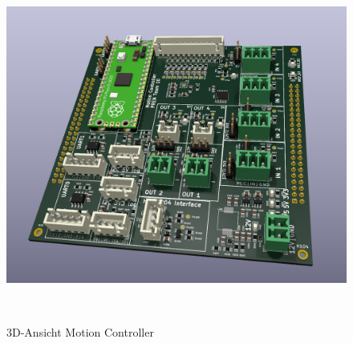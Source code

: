 \documentclass[main.tex]{subfiles} %
\begin{document}
\begin{figure}[H]
    \centering
    \includegraphics[width = 0.75\linewidth]{fig_Antriebe_und_Dimensionierung/MotionControllerPCB.jpg}
    \caption{3D-Ansicht Motion Controller}~\label{fig:MotionBoard_PCB}
\end{figure}
\end{document}
